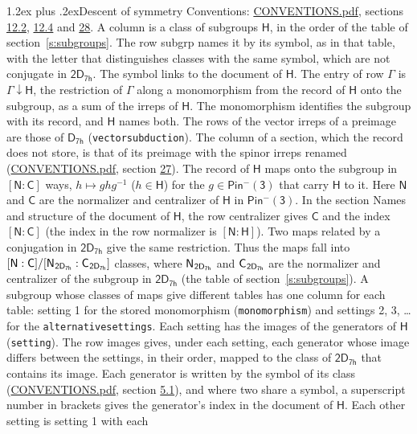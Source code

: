 \documentclass[10pt,a4paper]{article}
\makeatletter
\renewcommand\section{\@startsection{section}{1}{\z@}{-3ex plus -1ex minus -.2ex}%
  {1.2ex plus .2ex}{\normalfont\large\sffamily\bfseries\color{parttitle}}}
\numberwithin{equation}{section}
\newcommand{\grp}[1]{\mathsf{#1}}
\newcommand{\grpindex}[2]{[#1 : #2]}
\newcommand{\restr}[2]{#1\!\downarrow#2}
\newcommand{\hairsp}{\mkern1mu}
\makeatother
\begin{document}
\section{Descent of symmetry}\label{s:subduction}
Conventions: \href{../../CONVENTIONS.pdf}{CONVENTIONS.pdf}, sections \href{../../../rotation/CONVENTIONS.pdf\#conv.12.2}{12.2}, \href{../../../rotation/CONVENTIONS.pdf\#conv.12.4}{12.4} and \href{../../CONVENTIONS.pdf\#conv.28}{28}.
A column is a class of subgroups $\grp{H}$, in the order of the table of section~\ref{s:subgroups}. The row subgrp names it by its symbol, as in that table, with the letter that distinguishes classes with the same symbol, which are not conjugate in $\grp{2D_{7h}}$. The symbol links to the document of $\grp{H}$. The entry of row $\Gamma$ is $\restr{\Gamma}{\grp{H}}$, the restriction of $\Gamma$ along a monomorphism from the record of $\grp{H}$ onto the subgroup, as a sum of the irreps of $\grp{H}$. The monomorphism identifies the subgroup with its record, and $\grp{H}$ names both. The rows of the vector irreps of a preimage are those of \href{../../../rotation/data/pdf/D7h.pdf}{$\grp{D_{7h}}$} (\texttt{vectorsubduction}). The column of a section, which the record does not store, is that of its preimage with the spinor irreps renamed (\href{../../CONVENTIONS.pdf}{CONVENTIONS.pdf}, section \href{../../CONVENTIONS.pdf\#conv.27}{27}). \label{n:group.normalizer.o3}\label{n:group.centralizer.o3}\label{n:element.h}The record of $\grp{H}$ maps onto the subgroup in $\grpindex{\grp{N}}{\grp{C}}$ ways, $h \mapsto g h g^{-1}$ ($h \in \grp{H}$) for the $g \in \grp{Pin^{-}(3)}$ that carry $\grp{H}$ to it. Here $\grp{N}$ and $\grp{C}$ are the normalizer and centralizer of $\grp{H}$ in \href{Pinminus3.pdf}{$\grp{Pin^{-}(3)}$}. In the section Names and structure of the document of $\grp{H}$, the row centralizer gives $\grp{C}$ and the index $\grpindex{\grp{N}}{\grp{C}}$ (the index in the row normalizer is $\grpindex{\grp{N}}{\grp{H}}$). Two maps related by a conjugation in $\grp{2D_{7h}}$ give the same restriction. Thus the maps fall into $\grpindex{\grp{N}}{\grp{C}}/\grpindex{\grp{N}_{\hairsp \grp{2D_{7h}}}}{\grp{C}_{\hairsp \grp{2D_{7h}}}}$ classes, where $\grp{N}_{\hairsp \grp{2D_{7h}}}$ and $\grp{C}_{\hairsp \grp{2D_{7h}}}$ are the normalizer and centralizer of the subgroup in $\grp{2D_{7h}}$ (the table of section~\ref{s:subgroups}). \label{n:head.setting}A subgroup whose classes of maps give different tables has one column for each table: setting 1 for the stored monomorphism (\texttt{monomorphism}) and settings 2, 3, \dots{} for the \texttt{alternativesettings}. Each setting has the images of the generators of $\grp{H}$ (\texttt{setting}). \label{n:head.images}The row images gives, under each setting, each generator whose image differs between the settings, in their order, mapped to the class of $\grp{2D_{7h}}$ that contains its image. Each generator is written by the symbol of its class (\href{../../CONVENTIONS.pdf}{CONVENTIONS.pdf}, section \href{../../../rotation/CONVENTIONS.pdf\#conv.5.1}{5.1}), and where two share a symbol, a superscript number in brackets gives the generator's index in the document of $\grp{H}$. \label{n:irrep.Delta}Each other setting is setting 1 with each 
\end{document}
